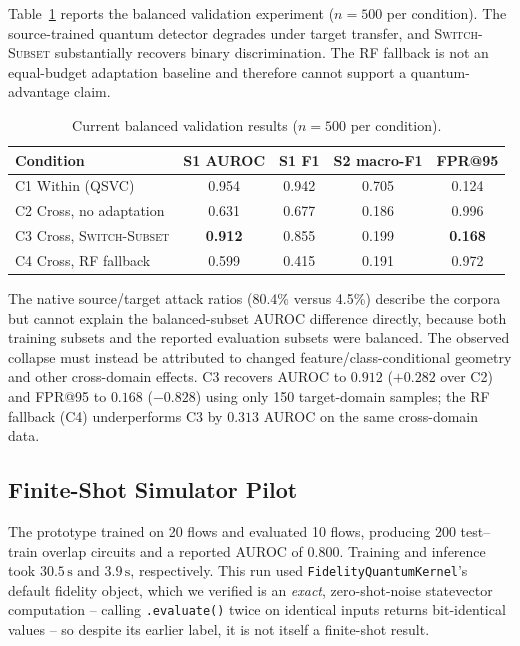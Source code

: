 \documentclass[conference]{IEEEtran}
\begin{document}
Table~\ref{tab:validation} reports the balanced validation experiment
($n{=}500$ per condition). The source-trained quantum detector degrades
under target transfer, and \textsc{Switch-Subset} substantially recovers
binary discrimination. The RF fallback is not an equal-budget adaptation
baseline and therefore cannot support a quantum-advantage claim.

\begin{table}[t]
\centering
\caption{Current balanced validation results ($n=500$ per condition).}
\label{tab:validation}
\renewcommand{\arraystretch}{1.1}
\begin{tabular}{@{}lcccc@{}}
\toprule
\textbf{Condition} & \textbf{S1 AUROC} & \textbf{S1 F1}
                   & \textbf{S2 macro-F1} & \textbf{FPR@95} \\
\midrule
C1 Within (QSVC)         & 0.954 & 0.942 & 0.705 & 0.124 \\
C2 Cross, no adaptation  & 0.631 & 0.677 & 0.186 & 0.996 \\
C3 Cross, \textsc{Switch-Subset} & \textbf{0.912} & 0.855 & 0.199 & \textbf{0.168} \\
C4 Cross, RF fallback    & 0.599 & 0.415 & 0.191 & 0.972 \\
\bottomrule
\end{tabular}
\end{table}

The native source/target attack ratios (80.4\% versus 4.5\%) describe the
corpora but cannot explain the balanced-subset AUROC difference directly,
because both training subsets and the reported evaluation subsets were
balanced. The observed collapse must instead be attributed to changed
feature/class-conditional geometry and other cross-domain effects. C3
recovers AUROC to $0.912$ ($+0.282$ over C2) and FPR@95 to $0.168$
($-0.828$) using only 150 target-domain samples; the RF fallback (C4)
underperforms C3 by $0.313$ AUROC on the same cross-domain data.

\subsection{Finite-Shot Simulator Pilot}
\label{subsec:finiteshot}

The prototype trained on 20 flows and evaluated 10 flows, producing 200
test--train overlap circuits and a reported AUROC of $0.800$. Training and
inference took $30.5\,\text{s}$ and $3.9\,\text{s}$, respectively. This
run used \texttt{FidelityQuantumKernel}'s default fidelity object, which
we verified is an \emph{exact}, zero-shot-noise statevector computation --
calling \texttt{.evaluate()} twice on identical inputs returns
bit-identical values -- so despite its earlier label, it is not itself a
finite-shot result.
\end{document}
